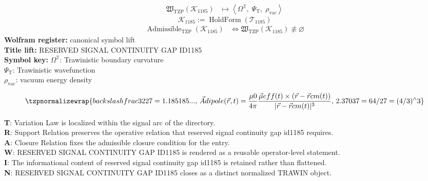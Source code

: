 \noindent
\begin{minipage}[t]{0.48\linewidth}
\begingroup
\small
\[
\begin{aligned}
\mathfrak{W}_{\mathrm{TZP}}\!\left(\mathcal{K}_{1185}\right)
&\longmapsto
\left\langle \Omega^{\mathbb{T}},\; \Psi_{\mathrm{T}},\; \rho_{\mathrm{vac}} \right\rangle
\end{aligned}
\]
\[
\mathcal{K}_{1185}
:=
\operatorname{HoldForm}\!\left(\mathcal{T}_{1185}\right)
\]
\[
\begin{aligned}
\operatorname{Admissible}_{\mathrm{TZP}}\!\left(\mathcal{K}_{1185}\right)
&\Longleftrightarrow
\mathfrak{W}_{\mathrm{TZP}}\!\left(\mathcal{K}_{1185}\right)\not\equiv\varnothing
\end{aligned}
\]
\textbf{Wolfram register:} canonical symbol lift\\
\textbf{Title lift:} RESERVED SIGNAL CONTINUITY GAP ID1185\\
\textbf{Symbol key:} \(\Omega^{\mathbb{T}}\): Trawinistic boundary curvature\\ \(\Psi_{\mathrm{T}}\): Trawinistic wavefunction\\ \(\rho_{\mathrm{vac}}\): vacuum energy density
\par
\endgroup
\end{minipage}\hfill
\begin{minipage}[t]{0.48\linewidth}
\[
\tzpnormalizewrap{backslash frac{32}{27}=1.185185...,\,\vec{A} {dipole}(\vec{r},t) = \frac{\mu {0}}{4\pi}\frac{\vec{\mu} {eff}(t)\times(\vec{r}-\vec{r} {cm}(t))}{|\vec{r}-\vec{r} {cm}(t)|^{3}},\,2.37037=64/27=(4/3)^{\wedge}3}
\]

\small
\textbf{T}: Variation Law is localized within the signal arc of the directory.\\
\textbf{R}: Support Relation preserves the operative relation that reserved signal continuity gap id1185 requires.\\
\textbf{A}: Closure Relation fixes the admissible closure condition for the entry.\\
\textbf{W}: RESERVED SIGNAL CONTINUITY GAP ID1185 is rendered as a reusable operator-level statement.\\
\textbf{I}: The informational content of reserved signal continuity gap id1185 is retained rather than flattened.\\
\textbf{N}: RESERVED SIGNAL CONTINUITY GAP ID1185 closes as a distinct normalized TRAWIN object.
\normalsize
\end{minipage}

